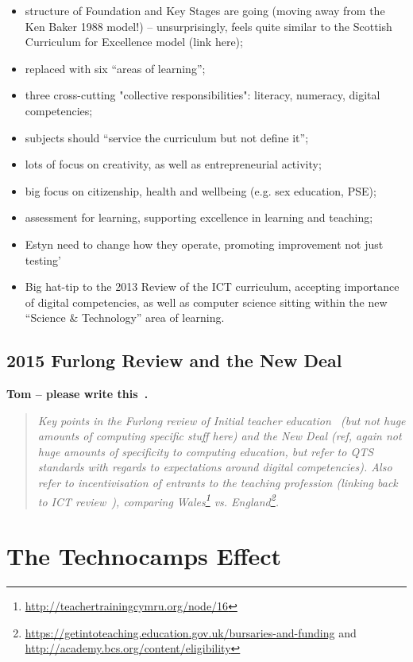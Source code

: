 \documentclass{sig-alternate}
\begin{document}
\begin{itemize}
\item structure of Foundation and Key Stages are going (moving away
  from the Ken Baker 1988 model!) -- unsurprisingly, feels quite
  similar to the Scottish Curriculum for Excellence model (link here);
\item replaced with six ``areas of learning'';
\item three cross-cutting "collective responsibilities": literacy, numeracy, digital competencies;
\item subjects should ``service the curriculum but not define it'';
\item lots of focus on creativity, as well as entrepreneurial activity;
\item big focus on citizenship, health and wellbeing (e.g. sex education, PSE);
\item assessment for learning, supporting excellence in learning and teaching;
\item Estyn need to change how they operate, promoting improvement not just testing'
\item Big hat-tip to the 2013 Review of the ICT curriculum, accepting
  importance of digital competencies, as well as computer science
  sitting within the new ``Science \& Technology'' area of learning.
\end{itemize}

\subsection{2015 Furlong Review and the New Deal}

\textbf{Tom -- please write this~\cite{Furlong:2015}.}

\begin{quote}\it
Key points in the Furlong review of Initial teacher
education~\cite{Furlong:2015} (but not huge amounts of computing
specific stuff here) and the New Deal (ref, again not huge amounts of
specificity to computing education, but refer to QTS standards with
regards to expectations around digital competencies). Also refer to
incentivisation of entrants to the teaching profession (linking back
to ICT review~\cite{welshictreview:2013}), comparing
Wales\footnote{\url{http://teachertrainingcymru.org/node/16}}
vs. England\footnote{\url{https://getintoteaching.education.gov.uk/bursaries-and-funding}
and \url{http://academy.bcs.org/content/eligibility}}.
\end{quote}

\section{The Technocamps Effect}
\end{document}
